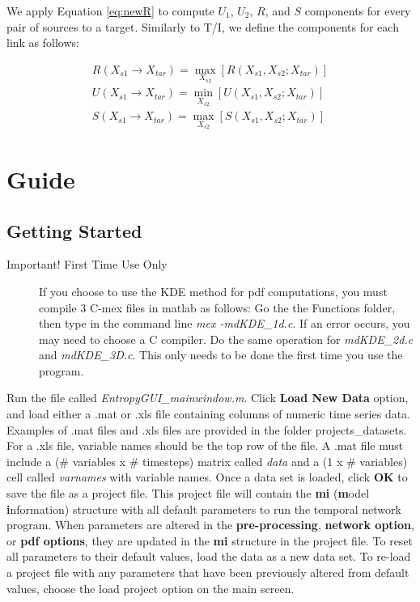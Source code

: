 \documentclass[a4paper]{article}
\begin{document}
We apply Equation \ref{eq:newR} to compute $U_1$, $U_2$, $R$, and $S$ components for every pair of sources to a target.  Similarly to T/I, we define the components for each link as follows:

\begin{eqnarray}
R(X_{s1} \rightarrow X_{tar}) = \underset{X_{s2}}{\operatorname{max}}  \left[R(X_{s1},X_{s2};X_{tar})\right] \\ \label{eq:Rpairwise}
U(X_{s1} \rightarrow X_{tar}) = \underset{X_{s2}}{\operatorname{min}}  \left[U(X_{s1},X_{s2};X_{tar})\right] \\ \label{eq:Upairwise}
S(X_{s1} \rightarrow X_{tar}) = \underset{X_{s2}}{\operatorname{max}}  \left[S(X_{s1},X_{s2};X_{tar})\right]  \label{eq:Spairwise}
\end{eqnarray}



\section{Guide}

\subsection{Getting Started}

\begin{description}
\item[Important! First Time Use Only] If you choose to use the KDE method for pdf computations, you must compile 3 C-mex files in matlab as follows: Go the the Functions folder, then type in the command line \textit{mex -mdKDE\_1d.c}.  If an error occurs, you may need to choose a C compiler.  Do the same operation for \textit{mdKDE\_2d.c} and \textit{mdKDE\_3D.c}.  This only needs to be done the first time you use the program.
\end{description}

Run the file called \textit{EntropyGUI\_mainwindow.m}.  Click \textbf{Load New Data} option, and load either a .mat or .xls file containing columns of numeric time series data. Examples of .mat files and .xls files are provided in the folder projects\_datasets. For a .xls file, variable names should be the top row of the file.  A .mat file must include a (\# variables x \# timesteps) matrix called \textit{data} and a (1 x \# variables)  cell called \textit{varnames} with variable names.  Once a data set is loaded, click \textbf{OK} to save the file as a project file.  This project file will contain the \textbf{mi} (\textbf{m}odel \textbf{i}nformation) structure with all default parameters to run the temporal network program.  When parameters are altered in the \textbf{pre-processing}, \textbf{network option}, or \textbf{pdf options}, they are updated in the \textbf{mi} structure in the project file.  To reset all parameters to their default values, load the data as a new data set.  To re-load a project file with any parameters that have been previously altered from default values, choose the load project option on the main screen.
\end{document}
